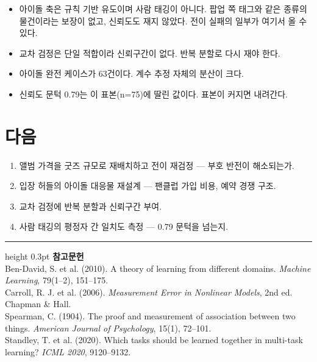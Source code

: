 \documentclass[10pt]{article}
\begin{document}
\begin{itemize}[leftmargin=1.1em,itemsep=0.15em]
\item 아이돌 축은 규칙 기반 유도이며 사람 태깅이 아니다. 팝업 쪽 태그와 같은 종류의
      물건이라는 보장이 없고, 신뢰도도 재지 않았다. 전이 실패의 일부가 여기서
      올 수 있다.
\item 교차 검정은 단일 적합이라 신뢰구간이 없다. 반복 분할로 다시 재야 한다.
\item 아이돌 완전 케이스가 63건이다. 계수 추정 자체의 분산이 크다.
\item 신뢰도 문턱 0.79는 이 표본(n=75)에 딸린 값이다. 표본이 커지면 내려간다.
\end{itemize}

\section{다음}

\begin{enumerate}[leftmargin=1.3em,itemsep=0.15em]
\item 앨범 가격을 굿즈 규모로 재배치하고 전이 재검정 --- 부호 반전이 해소되는가.
\item 입장 허들의 아이돌 대응물 재설계 --- 팬클럽 가입 비용, 예약 경쟁 구조.
\item 교차 검정에 반복 분할과 신뢰구간 부여.
\item 사람 태깅의 평정자 간 일치도 측정 --- 0.79 문턱을 넘는지.
\end{enumerate}

\vspace{0.6em}
\hrule height 0.3pt
\vspace{0.5em}
{\footnotesize
\textbf{참고문헌}\\[0.3em]
Ben-David, S. et al. (2010). A theory of learning from different domains.
\emph{Machine Learning}, 79(1--2), 151--175.\\[0.15em]
Carroll, R. J. et al. (2006). \emph{Measurement Error in Nonlinear Models},
2nd ed. Chapman \& Hall.\\[0.15em]
Spearman, C. (1904). The proof and measurement of association between two things.
\emph{American Journal of Psychology}, 15(1), 72--101.\\[0.15em]
Standley, T. et al. (2020). Which tasks should be learned together in multi-task
learning? \emph{ICML 2020}, 9120--9132.
}
\end{document}
